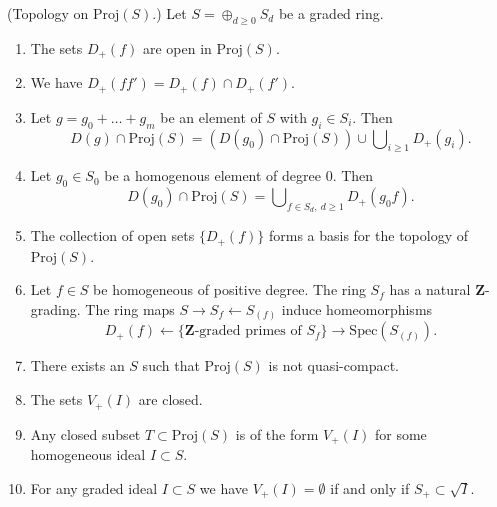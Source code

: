 \begin{lemma}
\label{lemma-topology-proj}
(Topology on $\text{Proj}(S)$.) 
Let $S = \oplus_{d \geq 0} S_d$ be a graded ring.
\begin{enumerate}
\item The sets $D_{+}(f)$ are open in $\text{Proj}(S)$.
\item We have $D_{+}(ff') = D_{+}(f) \cap D_{+}(f')$.
\item Let $g = g_0 + \ldots + g_m$ be an element
of $S$ with $g_i \in S_i$. Then
$$
D(g) \cap \text{Proj}(S) =
(D(g_0) \cap \text{Proj}(S))
\cup
\bigcup\nolimits_{i \geq 1} D_{+}(g_i).
$$
\item
Let $g_0\in S_0$ be a homogenous element of degree $0$. Then
$$
D(g_0) \cap \text{Proj}(S)
= 
\bigcup\nolimits_{f \in S_d,\ d\geq 1} D_{+}(g_0 f).
$$
\item The collection of open sets $\{D_{+}(f)\}$ forms a
basis for the topology of $\text{Proj}(S)$.
\item Let $f \in S$ be homogeneous of positive degree.
The ring $S_f$ has a natural $\mathbf{Z}$-grading.
The ring maps $S \to S_f \leftarrow S_{(f)}$ induce
homeomorphisms
$$
D_{+}(f)
\leftarrow
\{\mathbf{Z}\text{-graded primes of }S_f\}
\rightarrow
\text{Spec}(S_{(f)}).
$$
\item There exists an $S$ such that $\text{Proj}(S)$ is not
quasi-compact.
\item The sets $V_{+}(I)$ are closed.
\item Any closed subset $T \subset \text{Proj}(S)$ is of
the form $V_{+}(I)$ for some homogeneous ideal $I \subset S$.
\item For any graded ideal $I \subset S$ we have
$V_{+}(I) = \emptyset$ if and only if $S_{+} \subset \sqrt{I}$.
\end{enumerate}
\end{lemma}

